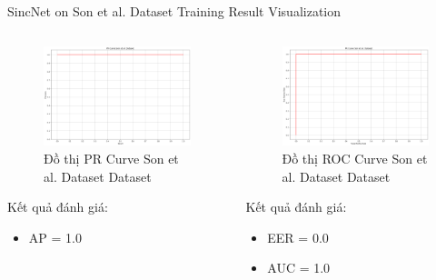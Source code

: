\documentclass[notheorems, aspectratio=54]{beamer}
\begin{document}
\begin{frame}{SincNet on Son et al. Dataset Training Result Visualization}
	\begin{columns}
		\begin{column}{0.47\textwidth}
			\begin{figure}[H]
				\includegraphics[width=0.9\linewidth]{result/pr_curve_vietnamese.png}
				\caption{Đồ thị PR Curve Son et al. Dataset Dataset}
			\end{figure}
			Kết quả đánh giá:
			\begin{itemize}
				\item AP = 1.0
			\end{itemize}
		\end{column}
		\begin{column}{0.5\textwidth}
			\begin{figure}[H]
				\includegraphics[width=0.9\linewidth]{result/roc_curve_vietnamese.png}
				\caption{Đồ thị ROC Curve Son et al. Dataset Dataset}
			\end{figure}
			Kết quả đánh giá:
			\begin{itemize}
				\item EER = 0.0
				\item AUC = 1.0
			\end{itemize}
		\end{column}
	\end{columns}
\end{frame}
\end{document}
